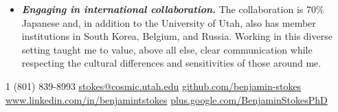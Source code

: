 \documentclass[10pt,letterpaper]{article} %
\begin{document}
{{{\begin{itemize}
       observatory is operational 24 hours per day, 365 days
      per year.  With operational costs and capital outlays exceeding
      \$100,000 per month, it is imperative that any problems be
      addressed promptly. As a mid-level collaboration member, I
      developed the skills to rapidly troubleshoot a broad array of
      hardware and software problems.
    \item \textit{\textbf{Engaging in international collaboration.}}
      The  collaboration is 70\% Japanese and, in addition to
      the University of Utah, also has member institutions in South
      Korea, Belgium, and Russia.  Working in this diverse setting
      taught me to value, above all else, clear communication while
      respecting the cultural differences and sensitivities of those
      around me.
\end{itemize}}}}

\newpage



\noindent\textsmaller{+}1 (801) 839-8993\bull
\href{mailto:stokes@cosmic.utah.edu}{stokes@cosmic.utah.edu}\bull
\href{https://github.com/benjamin-stokes}
{github.com/benjamin-stokes}\\
\href{http://www.linkedin.com/in/benjamintstokes}
{www.linkedin.com/in/benjamintstokes}\bull
\href{https://plus.google.com/+BenjaminStokesPhD}
{plus.google.com/\textsmaller{+}BenjaminStokesPhD}

\spacedhrule{0.9em}{-0.2em}


\end{document}
